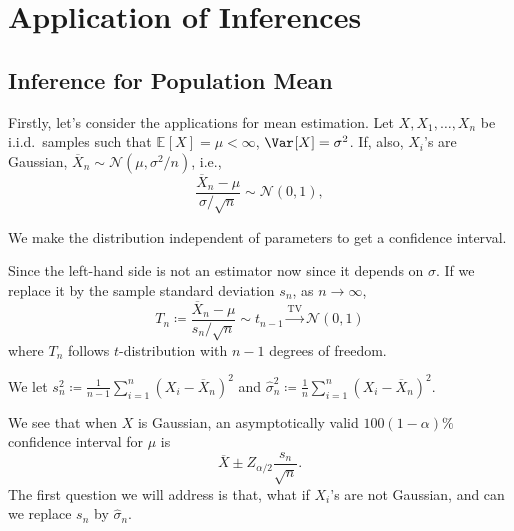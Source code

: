 \section{Application of Inferences}

\subsection{Inference for Population Mean}
Firstly, let's consider the applications for mean estimation. Let \(X, X_1, \dots , X_n\) be i.i.d.\ samples such that \(\mathbb{E}_{}[X] = \mu < \infty \), \(\Var_{}[X] = \sigma ^2\). If, also, \(X_i\)'s are Gaussian, \(\overline{X} _n \sim \mathcal{N} (\mu , \sigma ^2 / n)\), i.e.,
\[
	\frac{\overline{X} _n - \mu }{\sigma / \sqrt{n} } \sim \mathcal{N} (0, 1),
\]

\begin{intuition}
	We make the distribution independent of parameters to get a confidence interval.
\end{intuition}

Since the left-hand side is not an estimator now since it depends on \(\sigma \). If we replace it by the sample standard deviation \(s_n\), as \(n \to \infty \),
\[
	T_n \coloneqq \frac{\overline{X} _n - \mu }{s_n / \sqrt{n} } \sim t_{n-1} \overset{\operatorname{TV}}{\to } \mathcal{N} (0, 1)
\]
where \(T_n\) follows \(t\)-distribution with \(n-1\) degrees of freedom.

\begin{notation}
	We let \(s_n^2 \coloneqq \frac{1}{n-1} \sum_{i=1}^{n} (X_i - \overline{X} _n)^2\) and \(\hat{\sigma} _n^2 \coloneqq \frac{1}{n} \sum_{i=1}^{n} (X_i - \overline{X} _n)^2\).
\end{notation}

We see that when \(X\) is Gaussian, an asymptotically valid \(100 (1 - \alpha )\%\) confidence interval for \(\mu \) is
\[
	\overline{X} \pm Z_{\alpha / 2} \frac{s_n}{\sqrt{n} }.
\]
The first question we will address is that, what if \(X_i\)'s are not Gaussian, and can we replace \(s_n\) by \(\hat{\sigma} _n\).


